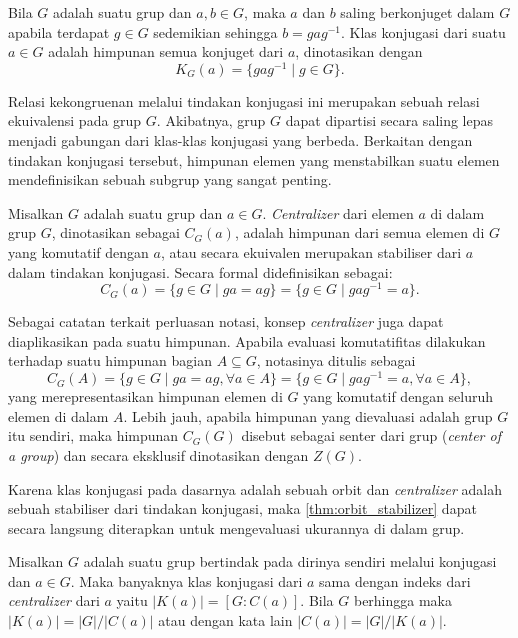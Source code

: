 \begin{definisi}\label{def:konjugasi_abstrak}
  Bila $G$ adalah suatu grup dan $a, b \in G$, maka $a$ dan $b$ saling berkonjuget dalam $G$ apabila terdapat $g \in G$ sedemikian sehingga $b = gag^{-1}$. Klas konjugasi dari suatu $a \in G$ adalah himpunan semua konjuget dari $a$, dinotasikan dengan
  \[
    K_G(a) = \{gag^{-1} \mid g \in G\}.
  \]
\end{definisi}

Relasi kekongruenan melalui tindakan konjugasi ini merupakan sebuah relasi ekuivalensi pada grup $G$. Akibatnya, grup $G$ dapat dipartisi secara saling lepas menjadi gabungan dari klas-klas konjugasi yang berbeda. Berkaitan dengan tindakan konjugasi tersebut, himpunan elemen yang menstabilkan suatu elemen mendefinisikan sebuah subgrup yang sangat penting.

\begin{definisi}\label{def:centralizer_abstrak}
  Misalkan $G$ adalah suatu grup dan $a \in G$. \emph{Centralizer} dari elemen $a$ di dalam grup $G$, dinotasikan sebagai $C_G(a)$, adalah himpunan dari semua elemen di $G$ yang komutatif dengan $a$, atau secara ekuivalen merupakan stabiliser dari $a$ dalam tindakan konjugasi. Secara formal didefinisikan sebagai:
  \[
    C_G(a) = \{g \in G \mid ga = ag\} = \{g \in G \mid gag^{-1} = a\}.
  \]
\end{definisi}

Sebagai catatan terkait perluasan notasi, konsep \emph{centralizer} juga dapat diaplikasikan pada suatu himpunan. Apabila evaluasi komutatifitas dilakukan terhadap suatu himpunan bagian $A \subseteq G$, notasinya ditulis sebagai
\[
  C_G(A)=\{g \in G \mid ga = ag, \forall a \in A\} = \{g \in G \mid gag^{-1} = a, \forall a \in A\},
\]
yang merepresentasikan himpunan elemen di $G$ yang komutatif dengan seluruh elemen di dalam $A$. Lebih jauh, apabila himpunan yang dievaluasi adalah grup $G$ itu sendiri, maka himpunan $C_G(G)$ disebut sebagai senter dari grup (\emph{center of a group}) dan secara eksklusif dinotasikan dengan $Z(G)$.

Karena klas konjugasi pada dasarnya adalah sebuah orbit dan \emph{centralizer} adalah sebuah stabiliser dari tindakan konjugasi, maka \autoref{thm:orbit_stabilizer} dapat secara langsung diterapkan untuk mengevaluasi ukurannya di dalam grup.

\begin{proposisi}\label{prop:kardinalitas_centralizer}
  Misalkan $G$ adalah suatu grup bertindak pada dirinya sendiri melalui konjugasi dan $a \in G$. Maka banyaknya klas konjugasi dari $a$ sama dengan indeks dari \emph{centralizer} dari $a$ yaitu $|K(a)| = [G : C(a)]$. Bila $G$ berhingga maka $|K(a)| = |G|/|C(a)|$ atau dengan kata lain $|C(a)| = |G|/|K(a)|$.
\end{proposisi}

